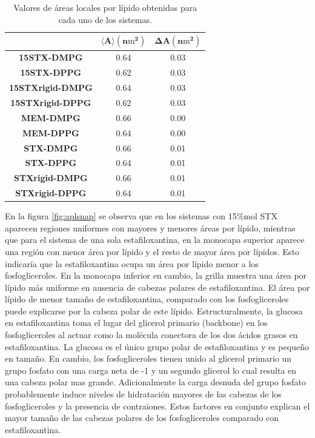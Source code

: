 \begin{table}
\centering
\begin{tabular}{|c|c|c|}
\toprule
{} &  $\mathbf{\langle A\rangle(n\mathrm{m}^{2})}$ &  $\mathbf{\Delta A(n\mathrm{m}^{2})}$ \\
\midrule
\textbf{15STX-DMPG     } &            0.64 &        0.03 \\
\textbf{15STX-DPPG     } &            0.62 &        0.03 \\
\textbf{15STXrigid-DMPG} &            0.64 &        0.03 \\
\textbf{15STXrigid-DPPG} &            0.62 &        0.03 \\
\textbf{MEM-DMPG       } &            0.66 &        0.00 \\
\textbf{MEM-DPPG       } &            0.64 &        0.00 \\
\textbf{STX-DMPG       } &            0.66 &        0.01 \\
\textbf{STX-DPPG       } &            0.64 &        0.01 \\
\textbf{STXrigid-DMPG  } &            0.66 &        0.01 \\
\textbf{STXrigid-DPPG  } &            0.64 &        0.01 \\
\bottomrule
\end{tabular}
\caption{Valores de \'{a}reas locales por l\'{i}pido obtenidas para cada uno de los sistemas.}
    \label{tab:aplglomepro}
\end{table}
En la figura \ref{fig:aplsnap} se observa que en los sistemas con 15\%mol STX aparecen regiones uniformes con mayores y menores \'{a}reas por l\'{i}pido, mientras que para el sistema de una sola estafiloxantina, en la monocapa superior aparece una regi\'{o}n con menor \'{a}rea por l\'{i}pido y el resto de mayor \'{a}rea por l\'{i}pidos. Esto indicar\'{i}a que la estafiloxantina ocupa un \'{a}rea por l\'{i}pido menor a los fosfogliceroles. En la monocapa inferior en cambio, la grilla muestra una \'{a}rea por l\'{i}pido m\'{a}s uniforme en ausencia de cabezas polares de estafiloxantina. El \'{a}rea por l\'{i}pido de menor tama\~{n}o de estafiloxantina, comparado con los fosfogliceroles puede explicarse por la cabeza polar de este l\'{i}pido. Estructuralmente, la glucosa en estafiloxantina toma el lugar del glicerol primario (backbone) en los fosfogliceroles al actuar como la mol\'{e}cula conectora de los dos \'{a}cidos grasos en estafiloxantina. La glucosa es el \'{u}nico grupo polar de estafiloxantina y es peque\~{n}o en tama\~{n}o. En cambio, los fosfogliceroles tienen unido al glicerol primario un grupo fosfato con una carga neta de -1 y un segundo glicerol lo cual resulta en una cabeza polar mas grande. Adicionalmente la carga desnuda del grupo fosfato probablemente induce niveles de hidrataci\'{o}n mayores de las cabezas de los fosfogliceroles y la presencia de contraiones. Estos factores en conjunto explican el mayor tama\~{n}o de las cabezas polares de los fosfogliceroles comparado con estafiloxantina. \\

